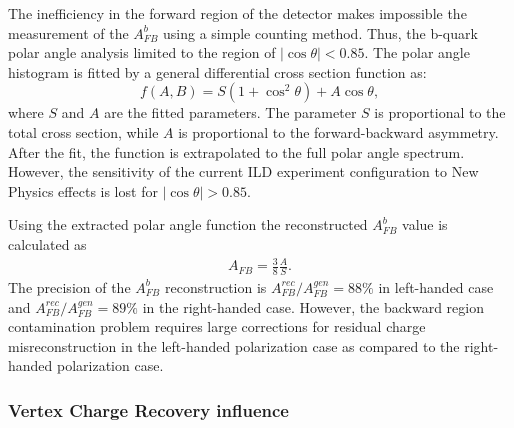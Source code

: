 The  inefficiency in the forward region of the detector makes impossible the measurement of the $A_{FB}^b$ using a simple counting method. 
Thus, the b-quark polar angle analysis limited to the region of $|\cos\theta| < 0.85$.
The polar angle histogram is fitted by a general differential cross section function as:
\begin{equation}
	f(A,B) = S(1+\cos^2\theta) + A \cos\theta, %
	\label{formula:PolarAngleFit_3}
\end{equation}
where $S$ and $A$ are the fitted parameters. 
The parameter $S$ is proportional to the total cross section, while $A$ is proportional to the forward-backward asymmetry.
After the fit, the function is extrapolated to the full polar angle spectrum.
However, the sensitivity of the current ILD experiment configuration to New Physics effects is lost for $|\cos\theta| > 0.85$.

Using the extracted polar angle function the reconstructed $A_{FB}^b$ value is calculated as
\begin{eqnarray}
	A_{FB} = \frac{3}{8}\frac{A}{S}.
\end{eqnarray} 
The precision of the $A_{FB}^b$ reconstruction is $A_{FB}^{rec}/A^{gen}_{FB} = 88\%$ in left-handed case and  $A_{FB}^{rec}/A^{gen}_{FB} = 89\%$ in the right-handed case.  
However, the backward region contamination problem requires large corrections for residual charge misreconstruction in the left-handed polarization case as compared to the right-handed polarization case. 


\subsubsection{Vertex Charge Recovery influence}

